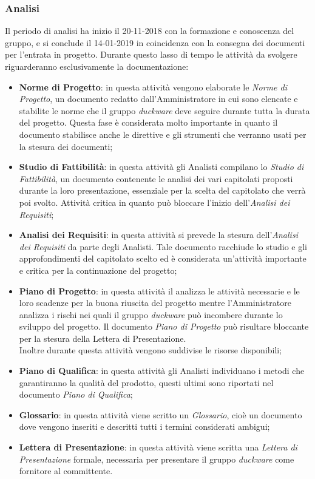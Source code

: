 \subsubsection{Analisi}
Il periodo di analisi ha inizio il 20-11-2018 con la formazione e conoscenza del gruppo, e si conclude il 14-01-2019 in coincidenza con la consegna dei documenti per l'entrata in progetto. Durante questo lasso di tempo le attività da svolgere riguarderanno esclusivamente la documentazione:
	\begin{itemize}
		\item \textbf{Norme di Progetto}: in questa attività vengono elaborate le \emph{Norme di Progetto}, un documento redatto dall'Amministratore in cui sono elencate e stabilite le norme che il gruppo \emph{duckware} deve seguire durante tutta la durata del progetto. Questa fase è considerata molto importante in quanto il documento stabilisce anche le direttive e gli strumenti che verranno usati per la stesura dei documenti;
		\item \textbf{Studio di Fattibilità}: in questa attività gli Analisti compilano lo \emph{Studio di Fattibilità}, un documento contenente le analisi dei vari capitolati proposti durante la loro presentazione, essenziale per la scelta del capitolato che verrà poi svolto. Attività critica in quanto può bloccare l'inizio dell'\emph{Analisi dei Requisiti};
		\item \textbf{Analisi dei Requisiti}: in questa attività si prevede la stesura dell'\emph{Analisi dei Requisiti} da parte degli Analisti. Tale documento racchiude lo studio e gli approfondimenti del capitolato scelto ed è considerata un'attività importante e critica per la continuazione del progetto;
		\item \textbf{Piano di Progetto}: in questa attività il  analizza le attività necessarie e le loro scadenze per la buona riuscita del progetto mentre l'Amministratore analizza i rischi nei quali il gruppo \emph{duckware} può incombere durante lo sviluppo del progetto. Il documento \emph{Piano di Progetto} può risultare bloccante per la stesura della Lettera di Presentazione. \\Inoltre durante questa attività vengono suddivise le risorse disponibili;
		\item \textbf{Piano di Qualifica}: in questa attività gli Analisti individuano i metodi che garantiranno la qualità del prodotto, questi ultimi sono riportati nel documento \emph{Piano di Qualifica};
		\item \textbf{Glossario}: in questa attività viene scritto un \emph{Glossario}, cioè un documento dove vengono inseriti e descritti tutti i termini considerati ambigui;
		\item \textbf{Lettera di Presentazione}: in questa attività viene scritta una \emph{Lettera di Presentazione} formale, necessaria per presentare il gruppo \emph{duckware} come fornitore al committente.
	\end{itemize}
